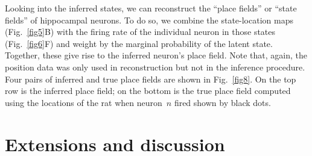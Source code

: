 Looking into the inferred states, we can reconstruct the ``place
fields'' or ``state fields'' of hippocampal neurons. To do so, we
combine the state-location maps (Fig.~\ref{fig5}B) with the firing
rate of the individual neuron in those states (Fig.~\ref{fig6}F) and
weight by the marginal probability of the latent state. Together,
these give rise to the inferred neuron's place field. Note that,
again, the position data was only used in reconstruction but not in
the inference procedure. Four pairs of inferred and true place fields
are shown in Fig.~\ref{fig8}. On the top row is the inferred place
field; on the bottom is the true place field computed using the
locations of the rat when neuron~$n$ fired shown by black dots.






\section{Extensions and discussion}

